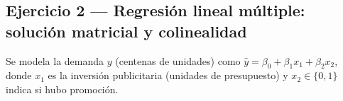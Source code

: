 \subsection{Ejercicio 2 --- Regresión lineal múltiple: solución matricial y colinealidad}

Se modela la demanda $y$ (centenas de unidades) como
$\hat y=\beta_0+\beta_1x_1+\beta_2x_2$, donde $x_1$ es la inversión
publicitaria (unidades de presupuesto) y $x_2\in\{0,1\}$ indica si hubo
promoción.

